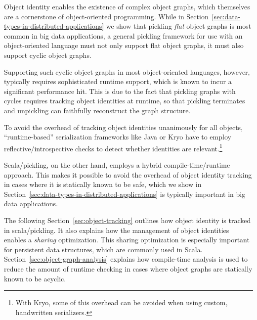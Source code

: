 \documentclass[10pt]{sigplanconf}
\theoremstyle{definition}
\theoremstyle{definition}
\begin{document}
Object identity enables the existence of complex object graphs, which
themselves are a cornerstone of object-oriented programming. While in
Section~\ref{sec:data-types-in-distributed-applications} we show that pickling
\textit{flat} object graphs is most common in big data applications, a general
pickling framework for use with an object-oriented language must not only
support flat object graphs, it must also support cyclic object graphs.

Supporting such cyclic object graphs in most object-oriented languages,
however, typically requires sophisticated runtime support, which is known to
incur a significant performance hit. This is due to the fact that pickling
graphs with cycles requires tracking object identities at runtime, so that
pickling terminates and unpickling can faithfully reconstruct the graph
structure.

To avoid the overhead of tracking object identities unanimously for all
objects, ``runtime-based'' serialization frameworks like Java or Kryo have to
employ reflective/introspective checks to detect whether identities are
relevant.\footnote{With Kryo, some of this overhead can be avoided when using custom, handwritten serializers.}

Scala/pickling, on the other hand, employs a hybrid compile-time/runtime
approach. This makes it possible to avoid the overhead of object identity
tracking in cases where it is statically known to be safe, which we show in
Section~\ref{sec:data-types-in-distributed-applications} is typically
important in big data applications.

The following Section~\ref{sec:object-tracking} outlines how object identity
is tracked in scala/pickling. It also explains how the management of object
identities enables a {\em sharing} optimization. This sharing optimization is
especially important for persistent data structures, which are commonly used
in Scala. Section~\ref{sec:object-graph-analysis} explains how compile-time
analysis is used to reduce the amount of runtime checking in cases where
object graphs are statically known to be acyclic.
\end{document}
